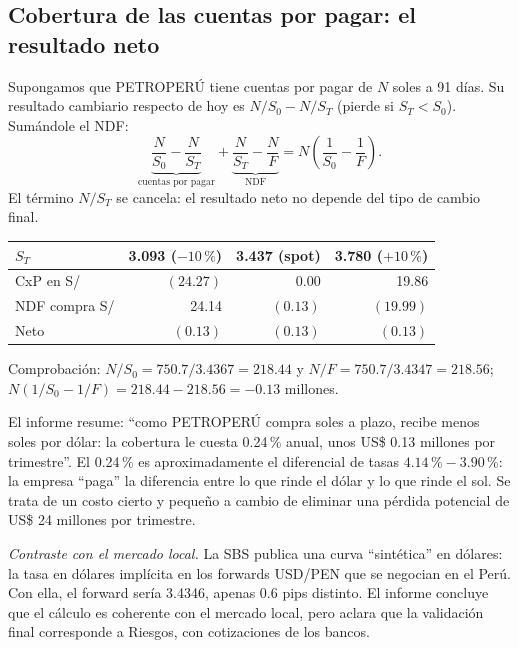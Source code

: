 \subsection{Cobertura de las cuentas por pagar: el resultado neto}

Supongamos que PETROPERÚ tiene cuentas por pagar de $N$ soles a 91 días. Su resultado cambiario respecto de hoy es $N/S_0-N/S_T$ (pierde si $S_T<S_0$). Sumándole el NDF:
\[ \underbrace{\frac{N}{S_0}-\frac{N}{S_T}}_{\text{cuentas por pagar}}+\underbrace{\frac{N}{S_T}-\frac{N}{F}}_{\text{NDF}}=N\left(\frac{1}{S_0}-\frac{1}{F}\right). \]
El término $N/S_T$ se cancela: el resultado neto no depende del tipo de cambio final.

\begin{center}\small
{}
\begin{tabular}{@{}lrrr@{}}
\toprule
$S_T$ & 3.093 ($-10\,\%$) & 3.437 (spot) & 3.780 ($+10\,\%$)\\
\midrule
CxP en S/ & $(24.27)$ & 0.00 & 19.86\\
NDF compra S/ & 24.14 & $(0.13)$ & $(19.99)$\\
\midrule
Neto & $(0.13)$ & $(0.13)$ & $(0.13)$\\
\bottomrule
\end{tabular}
\end{center}

Comprobación: $N/S_0=750.7/3.4367=218.44$ y $N/F=750.7/3.4347=218.56$; $N(1/S_0-1/F)=218.44-218.56=-0.13$ millones.


\begin{informe}
El informe resume: \enquote{como PETROPERÚ compra soles a plazo, recibe menos soles por dólar: la cobertura le cuesta 0.24\,\% anual, unos US\$ 0.13 millones por trimestre}. El 0.24\,\% es aproximadamente el diferencial de tasas $4.14\,\%-3.90\,\%$: la empresa \enquote{paga} la diferencia entre lo que rinde el dólar y lo que rinde el sol. Se trata de un costo cierto y pequeño a cambio de eliminar una pérdida potencial de US\$ 24 millones por trimestre.

\emph{Contraste con el mercado local.} La SBS publica una curva \enquote{sintética} en dólares: la tasa en dólares implícita en los forwards USD/PEN que se negocian en el Perú. Con ella, el forward sería 3.4346, apenas 0.6 pips distinto. El informe concluye que el cálculo es coherente con el mercado local, pero aclara que la validación final corresponde a Riesgos, con cotizaciones de los bancos.
\end{informe}

